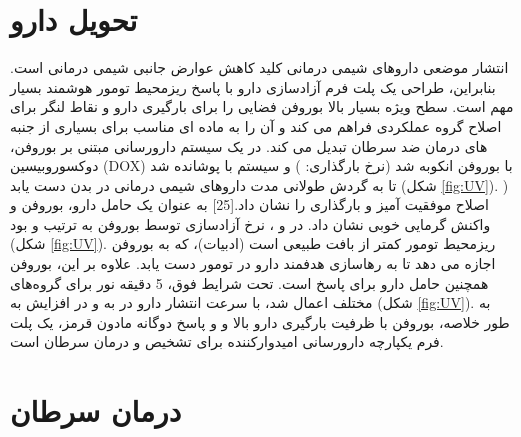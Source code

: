 \section{تحویل دارو }
انتشار موضعی داروهای شیمی درمانی کلید کاهش عوارض جانبی شیمی درمانی است. بنابراین، طراحی یک پلت فرم آزادسازی دارو با پاسخ ریزمحیط تومور هوشمند بسیار مهم است. سطح ویژه بسیار بالا بوروفن فضایی را برای بارگیری دارو و نقاط لنگر برای اصلاح گروه عملکردی فراهم می کند و آن را به ماده ای مناسب برای بسیاری از جنبه های درمان ضد سرطان تبدیل می کند. در یک سیستم دارورسانی مبتنی بر بوروفن، دوکسوروبیسین (DOX) با بوروفن انکوبه شد (نرخ بارگذاری: ) و سیستم با  پوشانده شد تا به گردش طولانی مدت داروهای شیمی درمانی در بدن دست یابد (شکل \ref{fig:UV}). ) اصلاح موفقیت آمیز  و بارگذاری  را نشان داد.\cite{jiNovelTopDownSynthesis2018}[25] به عنوان یک حامل دارو، بوروفن  و واکنش گرمایی خوبی نشان داد. در  و ، نرخ آزادسازی  توسط بوروفن به ترتیب  و  بود (شکل \ref{fig:UV}).  ریزمحیط تومور کمتر از بافت طبیعی است (ادبیات)، که به بوروفن اجازه می دهد تا به رهاسازی هدفمند دارو در تومور دست یابد. علاوه بر این، بوروفن همچنین حامل دارو برای پاسخ  است. تحت شرایط فوق، 5 دقیقه نور  برای گروه‌های  مختلف اعمال شد، با سرعت انتشار دارو در  به  و در  افزایش به  (شکل \ref{fig:UV}). به طور خلاصه، بوروفن با ظرفیت بارگیری دارو بالا و  و پاسخ دوگانه مادون قرمز، یک پلت فرم یکپارچه دارورسانی امیدوارکننده برای تشخیص و درمان سرطان است.\section{درمان سرطان}

